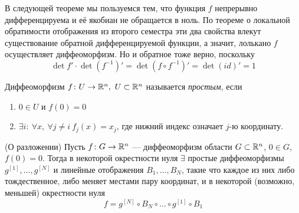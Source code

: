 \begin{anote}
	В следующей теореме мы пользуемся тем, что функция $f$ непрерывно дифференцируема и её якобиан не обращается в ноль. По теореме о локальной обратимости отображения из второго семестра эти два свойства влекут существование обратной дифференцируемой функции, а значит, лолькано $f$ осуществляет диффеоморфизм. Но и обратное тоже верно, поскольку
	\[
		\det{f'} \cdot \det{(f^{-1})'} = \det{(f \circ f^{-1})'} = \det{(id)'} = 1
	\]
\end{anote}

\begin{definition}
	Диффеоморфизм $f \colon U \to \mathbb{R}^n, \ U \subset \mathbb{R}^n$ называется \textit{простым}, если
	\begin{enumerate}
		\item
		$0 \in U$ и $f(0) = 0$
		\item 
		$\exists i \colon \ \forall x, \ \forall j \neq i \ f_j(x) = x_j$, где нижний индекс означает $j$-ю координату.
	\end{enumerate}
\end{definition}

\begin{theorem} (О разложении)
	Пусть $f \colon G \to \mathbb{R}^n$ --- диффеоморфизм области $G \subset \mathbb{R}^n$, $0 \in G$, $f(0) = 0$. Тогда в некоторой окрестности нуля $\exists$ простые диффеоморфизмы $g^{[1]}, \hdots, g^{[N]}$ и линейные отображения $B_1, \hdots, B_N$, такие что каждое из них либо тождественное, либо меняет местами пару координат, и в некоторой (возможно, меньшей) окрестности нуля
	\[
		f = g^{[N]} \circ B_N \circ \hdots \circ g^{[1]} \circ B_1
	\]
\end{theorem}

